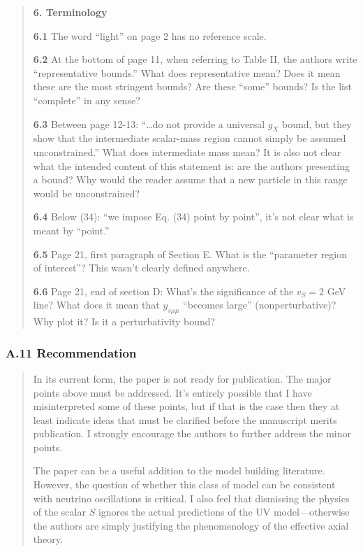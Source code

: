 \documentclass[
]{article}
\begin{document}
\begin{quote}
\textbf{6. Terminology}

\textbf{6.1} The word ``light'' on page 2 has no reference scale.

\textbf{6.2} At the bottom of page 11, when referring to Table II, the
authors write ``representative bounds.'' What does representative mean?
Does it mean these are the most stringent bounds? Are these ``some''
bounds? Is the list ``complete'' in any sense?

\textbf{6.3} Between page 12-13: ``\ldots do not provide a universal
\(g_X\) bound, but they show that the intermediate scalar-mass region
cannot simply be assumed unconstrained.'' What does intermediate mass
mean? It is also not clear what the intended content of this statement
is: are the authors presenting a bound? Why would the reader assume that
a new particle in this range would be unconstrained?

\textbf{6.4} Below (34): ``we impose Eq. (34) point by point'', it's not
clear what is meant by ``point.''

\textbf{6.5} Page 21, first paragraph of Section E. What is the
``parameter region of interest''? This wasn't clearly defined anywhere.

\textbf{6.6} Page 21, end of section D: What's the significance of the
\(v_S=2\) GeV line? What does it mean that \(y_{s\mu\mu}\) ``becomes
large'' (nonperturbative)? Why plot it? Is it a perturbativity bound?
\end{quote}

\subsubsection{A.11 Recommendation}\label{a.11-recommendation}

\begin{quote}
In its current form, the paper is not ready for publication. The major
points above must be addressed. It's entirely possible that I have
misinterpreted some of these points, but if that is the case then they
at least indicate ideas that must be clarified before the manuscript
merits publication. I strongly encourage the authors to further address
the minor points.

The paper can be a useful addition to the model building literature.
However, the question of whether this class of model can be consistent
with neutrino oscillations is critical. I also feel that dismissing the
physics of the scalar \(S\) ignores the actual predictions of the UV
model---otherwise the authors are simply justifying the phenomenology of
the effective axial theory.
\end{quote}
\end{document}
